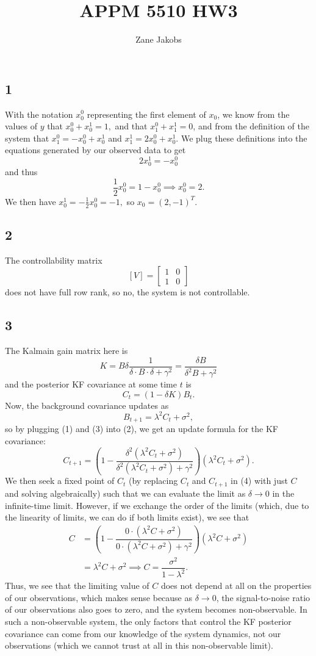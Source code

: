 \documentclass[11pt]{article}
\begin{document}
\title{APPM 5510 HW3}
\author{Zane Jakobs}
\date{}
\maketitle
\subsection*{1} With the notation $x_0^0$ representing the first element of $x_0$, we know from the values of $y$ that $x_0^0 + x_0^1 = 1,$ and that $x_1^0 + x_1^1 = 0$, and from the definition of the system that $x_1^0 = -x_0^0 + x_0^1$ and $x_1^1 = 2x_0^0 + x_0^1$. We plug these definitions into the equations generated by our observed data to get
\[
2x_0^1 = -x_0^0
\]
and thus
\[
\frac{1}{2} x_0^0 = 1- x_0^0 \implies x_0^0 = 2.
\]
We then have $x_0^1 = -\frac{1}{2} x_0^0 = -1,$ so $x_0 = (2,-1)^T.$
\subsection*{2} The controllability matrix
\[
[V] = \begin{bmatrix} 1 & 0\\  1 &0\end{bmatrix}
\]
does not have full row rank, so no, the system is not controllable.
\subsection*{3}
The Kalmain gain matrix here is 
\[
K = B\delta \dfrac{1}{\delta\cdot B \cdot \delta + \gamma^2} = \dfrac{\delta B}{\delta^2 B + \gamma^2}\tag{1}
\]
and the posterior KF covariance at some time $t$ is 
\[
C_t = (1-\delta K)B_t\tag{2}.
\]
Now, the background covariance updates as
\[
B_{t+1} = \lambda^2 C_t + \sigma^2, \tag{3}
\]
so by plugging (1) and (3) into (2), we get an update formula for the KF covariance:
\[
C_{t+1} = \left( 1  - \dfrac{\delta^2(\lambda^2 C_t +  \sigma^2)}{\delta^2(\lambda^2 C_t + \sigma^2) + \gamma^2}\right) (\lambda^2 C_t + \sigma^2).\tag{4}
\]
We then seek a fixed point of $C_t$ (by replacing $C_t$ and $C_{t+1}$ in (4) with just $C$ and solving algebraically) such that we can evaluate the limit as $\delta\to 0$ in the infinite-time limit. However, if we exchange the order of the limits (which, due to the linearity of limits, we can do if both limits exist), we see that
\[
\begin{aligned}
C &=  \left( 1  - \dfrac{0\cdot(\lambda^2 C +  \sigma^2)}{0\cdot(\lambda^2 C + \sigma^2) + \gamma^2}\right) (\lambda^2 C + \sigma^2)\\
&= \lambda^2 C + \sigma^2 \implies C = \dfrac{\sigma^2}{1-\lambda^2}.
\end{aligned}
\]
Thus, we see that the limiting value of $C$ does not depend at all on the properties of our observations, which makes sense because as $\delta\to 0$, the signal-to-noise ratio of our observations also goes to zero, and the system becomes non-observable. In such a non-observable system, the only factors that control the KF posterior covariance can come from our knowledge of the system dynamics, not our observations (which we cannot trust at all in this non-observable limit).
\end{document}
